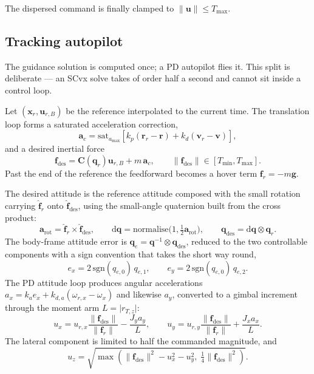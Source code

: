 \documentclass[11pt,a4paper]{article}
\newcommand{\vect}[1]{\mathbf{#1}}
\newcommand{\quat}[1]{\mathbf{#1}}
\newcommand{\dd}{\mathrm{d}}
\newcommand{\Rot}{\vect{C}}
\begin{document}
The dispersed command is finally clamped to $\lVert\vect{u}\rVert\le T_{\max}$.

\subsection{Tracking autopilot}

The guidance solution is computed once; a PD autopilot flies it. This split is
deliberate --- an SCvx solve takes of order half a second and cannot sit inside a
control loop.

Let $(\vect{x}_r,\vect{u}_{r,B})$ be the reference interpolated to the current
time. The translation loop forms a saturated acceleration correction,
\begin{equation}
\vect{a}_c = \mathrm{sat}_{a_{\max}}\!\left[
  k_{p}\left(\vect{r}_r-\vect{r}\right) + k_{d}\left(\vect{v}_r-\vect{v}\right)\right],
\end{equation}
and a desired inertial force
\begin{equation}
\vect{f}_{\mathrm{des}} = \Rot(\quat{q}_r)\vect{u}_{r,B} + m\,\vect{a}_c,
\qquad
\lVert\vect{f}_{\mathrm{des}}\rVert \in [T_{\min},T_{\max}].
\end{equation}
Past the end of the reference the feedforward becomes a hover term
$\vect{f}_r=-m\vect{g}$.

The desired attitude is the reference attitude composed with the small rotation
carrying $\hat{\vect{f}}_r$ onto $\hat{\vect{f}}_{\mathrm{des}}$, using the
small-angle quaternion built from the cross product:
\begin{equation}
\vect{a}_{\mathrm{rot}}=\hat{\vect{f}}_r\times\hat{\vect{f}}_{\mathrm{des}},
\qquad
\dd\quat{q}=\mathrm{normalise}\bigl(1,\tfrac{1}{2}\vect{a}_{\mathrm{rot}}\bigr),
\qquad
\quat{q}_{\mathrm{des}}=\dd\quat{q}\otimes\quat{q}_r .
\end{equation}
The body-frame attitude error is $\quat{q}_e=\quat{q}^{-1}\otimes\quat{q}_{\mathrm{des}}$,
reduced to the two controllable components with a sign convention that takes the
short way round,
\begin{equation}
e_x = 2\,\mathrm{sgn}(q_{e,0})\,q_{e,1},\qquad
e_y = 2\,\mathrm{sgn}(q_{e,0})\,q_{e,2}.
\end{equation}
The PD attitude loop produces angular accelerations
$a_x = k_{a}e_x + k_{d,a}(\omega_{r,x}-\omega_x)$ and likewise $a_y$, converted
to a gimbal increment through the moment arm $L=\lvert r_{T,z}\rvert$:
\begin{equation}
u_x = u_{r,x}\frac{\lVert\vect{f}_{\mathrm{des}}\rVert}{\lVert\vect{f}_r\rVert} - \frac{J_y a_y}{L},
\qquad
u_y = u_{r,y}\frac{\lVert\vect{f}_{\mathrm{des}}\rVert}{\lVert\vect{f}_r\rVert} + \frac{J_x a_x}{L}.
\end{equation}
The lateral component is limited to half the commanded magnitude, and
\begin{equation}
u_z=\sqrt{\max\!\left(\lVert\vect{f}_{\mathrm{des}}\rVert^2-u_x^2-u_y^2,\;
  \tfrac{1}{4}\lVert\vect{f}_{\mathrm{des}}\rVert^2\right)} .
\end{equation}
\end{document}
